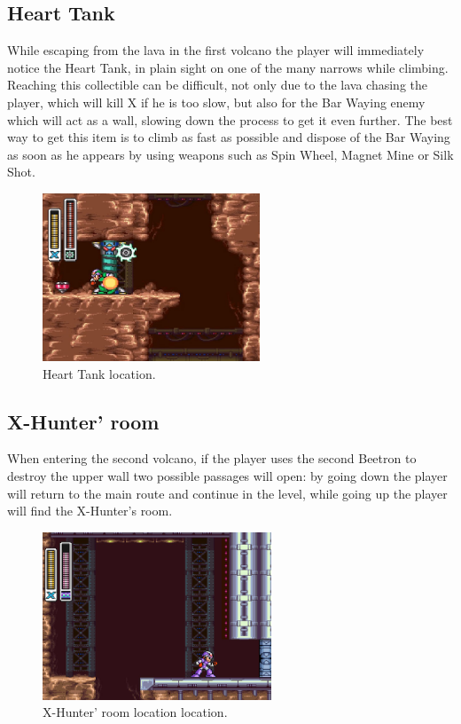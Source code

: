 \subsection{Heart Tank}
While escaping from the lava in the first volcano the player will immediately notice the Heart Tank, in plain sight on one of the many narrows while climbing. Reaching this collectible can be difficult, not only due to the lava chasing the player, which will kill X if he is too slow, but also for the Bar Waying enemy which will act as a wall, slowing down the process to get it even further. The best way to get this item is to climb as fast as possible and dispose of the Bar Waying as soon as he appears by using weapons such as Spin Wheel, Magnet Mine or Silk Shot.
\begin{figure}[htp]
	\centering
	\includegraphics[height=5cm]{figures/X2/Flame_stag/Stag_heart.png}
	\caption{Heart Tank location.}
\end{figure}

\subsection{X-Hunter' room}
When entering the second volcano, if the player uses the second Beetron to destroy the upper wall two possible passages will open: by going down the player will return to the main route and continue in the level, while going up the player will find the X-Hunter's room.
\begin{figure}[htp]
	\centering
	\includegraphics[height=5cm]{figures/X2/Flame_stag/Stag_Hunter_room.png}
	\caption{X-Hunter' room location location.}
\end{figure}



